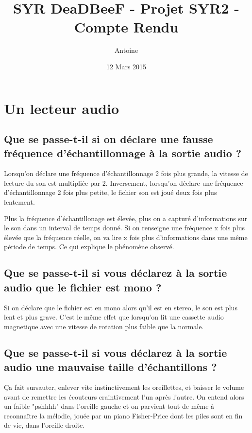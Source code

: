 \documentclass[a4paper,10pt,openany,oneside]{report}
\title{SYR DeaDBeeF - Projet SYR2 - Compte Rendu}
\author{Antoine \bsc{Pinsard}}
\date{12 Mars 2015}
\begin{document}
\maketitle

\section{Un lecteur audio}

\subsection{Que se passe-t-il si on déclare une fausse fréquence
            d'échantillonnage à la sortie audio ?}

Lorsqu'on déclare une fréquence d'échantillonnage 2 fois plus grande, la
vitesse de lecture du son est multipliée par 2. Inversement, lorsqu'on déclare
une fréquence d'échantillonnage 2 fois plus petite, le fichier son est joué
deux fois plus lentement.

Plus la fréquence d'échantillonage est élevée, plus on a capturé d'informations
sur le son dans un interval de temps donné. Si on renseigne une fréquence x
fois plus élevée que la fréquence réelle, on va lire x fois plus d'informations
dans une même période de temps. Ce qui explique le phénomène observé.

\subsection{Que se passe-t-il si vous déclarez à la sortie audio que le fichier
            est mono ?}

Si on déclare que le fichier est en mono alors qu'il est en stereo, le son est
plus lent et plus grave. C'est le même effet que lorsqu'on lit une cassette
audio magnetique avec une vitesse de rotation plus faible que la normale.

\subsection{Que se passe-t-il si vous déclarez à la sortie audio une mauvaise
            taille d'échantillons ?}

Ça fait sursauter, enlever vite instinctivement les oreillettes, et baisser le
volume avant de remettre les écouteurs craintivement l'un après l'autre. On
entend alors un faible "pshhhh" dans l'oreille gauche et on parvient tout de
même à reconnaître la mélodie, jouée par un piano Fisher-Price dont les piles
sont en fin de vie, dans l'oreille droite.
\end{document}
